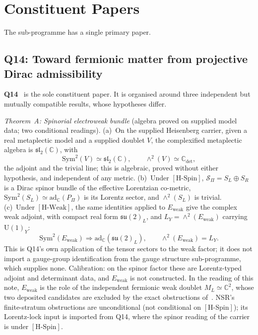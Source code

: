 \documentclass[11pt,a4paper]{article}
\theoremstyle{definition}
\newcommand{\su}{\mathfrak{su}}
\newcommand{\UU}{\mathrm{U}}
\newcommand{\Sbundle}{\mathcal{S}_\Pi}
\newcommand{\adC}{\mathrm{ad}_\mathbb{C}}
\newcommand{\Ew}{E_{\mathrm{weak}}}
\newcommand{\HSpin}{\ensuremath{[\mathrm{H\text{-}Spin}]}}
\newcommand{\HWeak}{\ensuremath{[\mathrm{H\text{-}Weak}]}}
\begin{document}
  \section{Constituent Papers}
    \label{sec:papers}

    The sub-programme has a single primary paper.

    \subsection{Q14: Toward fermionic matter from projective Dirac admissibility}
      \label{sec:q14}

      \textbf{Q14}~\cite{Beau2026q14} is the sole constituent paper.
      It is organised around three independent but mutually compatible results, whose hypotheses differ.

      \textit{Theorem~A: Spinorial electroweak bundle} (algebra proved on supplied model data; two conditional
      readings).
      (a)~On the supplied Heisenberg carrier, given a real metaplectic model and a supplied doublet $V$, the
      complexified metaplectic algebra is $\mathfrak{sl}_2(\mathbb{C})$, with
      \[
        \mathrm{Sym}^2(V) \simeq \mathfrak{sl}_2(\mathbb{C}), \qquad \wedge^2(V) \simeq \mathbb{C}_{\det},
      \]
      the adjoint and the trivial line; this is algebraic, proved without either hypothesis, and independent of any
      metric.
      (b)~Under \HSpin{}, $\Sbundle = S_L \oplus S_R$ is a Dirac spinor bundle of the effective Lorentzian co-metric,
      $\mathrm{Sym}^2(S_L) \simeq \adC(P_\Pi)$ is its Lorentz sector, and $\wedge^2(S_L)$ is trivial.
      (c)~Under \HWeak{}, the same identities applied to $\Ew$ give the complex weak adjoint, with compact real form
      $\su(2)_L$, and $L_Y = \wedge^2(\Ew)$ carrying $\UU(1)_Y$:
      \[
        \mathrm{Sym}^2(\Ew) \Rightarrow \adC(\su(2)_L), \qquad \wedge^2(\Ew) = L_Y.
      \]
      This is Q14's own application of the tensor sectors to the weak factor; it does not import a
      gauge-group identification from the gauge structure sub-programme, which supplies none.
      Calibration: on the spinor factor these are Lorentz-typed adjoint and determinant data, and $\Ew$ is not
      constructed.
      In the reading of this note, $\Ew$ is the role of the independent fermionic weak doublet
      $M_L \simeq \mathbb{C}^2$, whose two deposited candidates are excluded by the exact obstructions
      of~\cite{Beau2026nsr}.
      NSR's finite-stratum obstructions are unconditional (not conditional on \HSpin{}); its Lorentz-lock input is
      imported from Q14, where the spinor reading of the carrier is under \HSpin{}.
\end{document}
